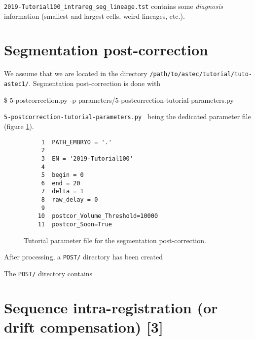 \texttt{2019-Tutorial100\_intrareg\_seg\_lineage.tst} contains some
\textit{diagnosis} information (smallest and largest cells, weird
lineages, etc.). 

\section{Segmentation post-correction}

We assume that we are located in the directory
\texttt{/path/to/astec/tutorial/tuto-astec1/}. Segmentation post-correction is
done with
\begin{code}{0.8}
  \$ 5-postcorrection.py -p parameters/5-postcorrection-tutorial-parameters.py 
\end{code}
\texttt{5-postcorrection-tutorial-parameters.py } being the
dedicated parameter file  (figure
\ref{fig:tutorial:parameter:post:correction}).


\begin{figure}
\begin{framed}
\begin{verbatim}
     1	PATH_EMBRYO = '.'
     2	
     3	EN = '2019-Tutorial100'
     4	
     5	begin = 0
     6	end = 20
     7	delta = 1
     8	raw_delay = 0
     9	
    10	postcor_Volume_Threshold=10000 	
    11	postcor_Soon=True 				
\end{verbatim}
\end{framed}
\caption{\label{fig:tutorial:parameter:post:correction} Tutorial
  parameter file for the segmentation post-correction.}
\end{figure}

After processing, a \texttt{POST/} directory has been created

\mbox{}
\mbox{}

The \texttt{POST/} directory contains

\mbox{}
\mbox{}



\section{Sequence intra-registration (or drift compensation) [3]}
\label{sec:tutorial:intra:registration:post}
 
